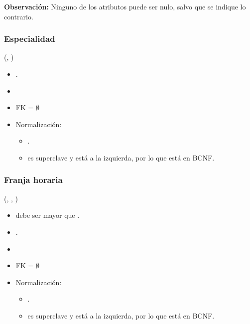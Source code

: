 \textbf{Observación:} Ninguno de los atributos puede ser nulo, salvo que se 
indique lo contrario.

\subsubsection{Especialidad}

    (, )

    \begin{itemize}
        \item {}.
        \item {}
        \item FK = $\emptyset$

        \item Normalización:
            
            \begin{itemize}
                \item {}.
                    
                \item {} es superclave y está a la izquierda, por lo
                    que está en BCNF.
            \end{itemize}
    \end{itemize}

\subsubsection{Franja horaria}

    (, , )

    \begin{itemize}
        \item {} debe ser mayor que .
        \item {}.
        \item {}
        \item FK = $\emptyset$

        \item Normalización:
            
            \begin{itemize}
                \item {}.
                    
                \item {} es superclave y está a la izquierda, por lo
                    que está en BCNF.
            \end{itemize}
    \end{itemize}

